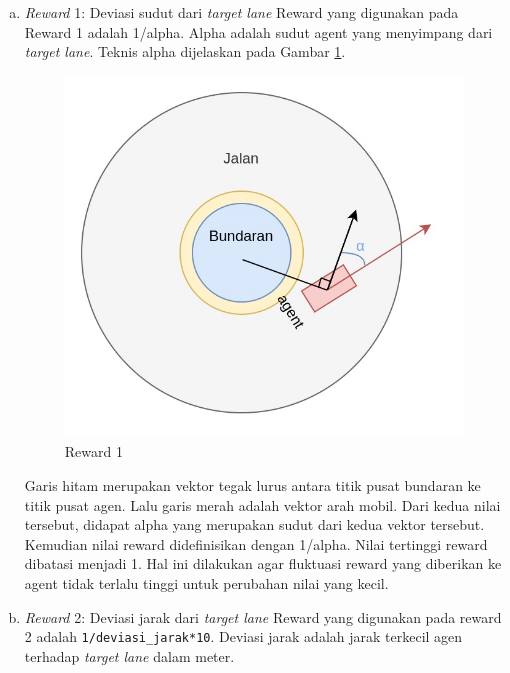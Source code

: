 \documentclass[conference]{IEEEtran}
\begin{document}
\begin{enumerate}[a)]
\item \textit{Reward} 1: Deviasi sudut dari \textit{target lane}
Reward yang digunakan pada Reward 1 adalah 1/alpha. Alpha adalah sudut agent yang menyimpang dari \textit{target lane}. Teknis alpha dijelaskan pada Gambar \ref{fig:reward_anglediff_sketch}. 

\begin{figure}[H] 
	\centering
	\includegraphics[width=1\linewidth]{images/reward_anglediff_sketch}
	\caption{Reward 1}
	\label{fig:reward_anglediff_sketch}
\end{figure}

Garis hitam merupakan vektor tegak lurus antara titik pusat bundaran ke titik pusat agen. Lalu garis merah adalah vektor arah mobil. Dari kedua nilai tersebut, didapat alpha yang merupakan sudut dari kedua vektor tersebut. Kemudian nilai reward didefinisikan dengan 1/alpha. Nilai tertinggi reward dibatasi menjadi 1. Hal ini dilakukan agar fluktuasi reward yang diberikan ke agent tidak terlalu tinggi untuk perubahan nilai yang kecil.


\item{\textit{Reward} 2: Deviasi jarak dari \textit{target lane}}
Reward yang digunakan pada reward 2 adalah \verb=1/deviasi_jarak*10=. Deviasi jarak adalah jarak terkecil agen terhadap \textit{target lane} dalam meter.


\end{enumerate}
\end{document}
